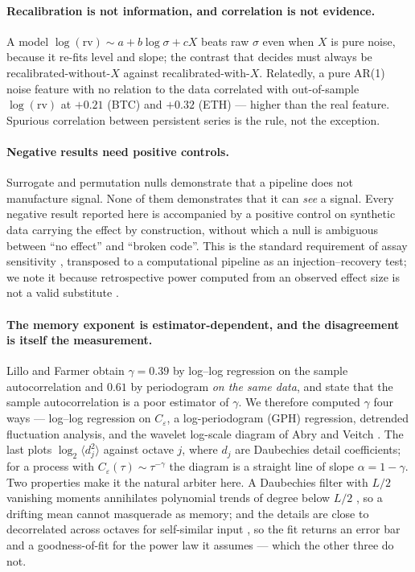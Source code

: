 \documentclass[aps,pre,twocolumn,superscriptaddress,floatfix,nofootinbib]{revtex4-2}
\newcommand{\eps}{\varepsilon}
\begin{document}
\paragraph*{Recalibration is not information, and correlation is not evidence.}
A model $\log(\mathrm{rv}) \sim a + b\log\sigma + cX$ beats raw $\sigma$ even
when $X$ is pure noise, because it re-fits level and slope; the contrast that
decides must always be recalibrated-without-$X$ against recalibrated-with-$X$.
Relatedly, a pure AR(1) noise feature with no relation to the data correlated
with out-of-sample $\log(\mathrm{rv})$ at $+0.21$ (BTC) and $+0.32$ (ETH) ---
higher than the real feature. Spurious correlation between persistent series is
the rule, not the exception.

\paragraph*{Negative results need positive controls.}
Surrogate and permutation nulls demonstrate that a pipeline does not manufacture
signal. None of them demonstrates that it can \emph{see} a signal. Every
negative result reported here is accompanied by a positive control on synthetic
data carrying the effect by construction, without which a null is ambiguous
between ``no effect'' and ``broken code''. This is the standard requirement of
assay sensitivity \cite{ich2000}, transposed to a computational pipeline as an
injection--recovery test; we note it because retrospective power computed from
an observed effect size is not a valid substitute \cite{hoenig2001}.

\paragraph*{The memory exponent is estimator-dependent, and the disagreement is
itself the measurement.}
Lillo and Farmer \cite{lillo2004} obtain $\gamma=0.39$ by log--log regression on
the sample autocorrelation and $0.61$ by periodogram \emph{on the same data},
and state that the sample autocorrelation is a poor estimator of $\gamma$. We
therefore computed $\gamma$ four ways --- log--log regression on $C_\eps$, a
log-periodogram (GPH) regression, detrended fluctuation analysis, and the
wavelet log-scale diagram of Abry and Veitch
\cite{abry1998,veitch1999}. The last plots $\log_2\langle d_j^2\rangle$ against
octave $j$, where $d_j$ are Daubechies detail coefficients; for a process with
$C_\eps(\tau)\sim\tau^{-\gamma}$ the diagram is a straight line of slope
$\alpha=1-\gamma$. Two properties make it the natural arbiter here. A Daubechies
filter with $L/2$ vanishing moments annihilates polynomial trends of degree
below $L/2$ \cite{daubechies1992}, so a drifting mean cannot masquerade as
memory; and the details are close to decorrelated across octaves for
self-similar input \cite{flandrin1992}, so the fit returns an error bar and a
goodness-of-fit for the power law it assumes --- which the other three do not.
\end{document}
